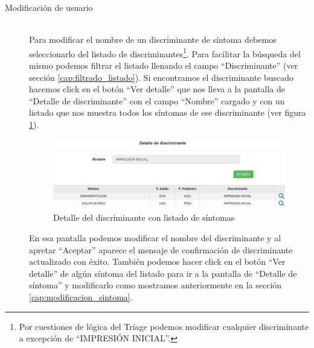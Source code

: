 \begin{description}
\item[Modificación de usuario] \mbox{} \\
Para modificar el nombre de un discriminante de síntoma debemos seleccionarlo del listado de discriminantes\footnote{Por cuestiones de lógica del Triage podemos modificar cualquier discriminante a excepción de ``IMPRESIÓN INICIAL''.}. Para facilitar la búsqueda del mismo podemos filtrar el listado llenando el campo ``Discriminante'' (ver sección \ref{cap:filtrado_listado}). Si encontramos el discriminante buscado hacemos click en el botón ``Ver detalle'' que nos lleva a la pantalla de ``Detalle de discriminante'' con el campo ``Nombre'' cargado y con un listado que nos muestra todos los síntomas de ese discriminante (ver figura \ref{fig:detalle_discriminante}).
\begin{figure}
\centerline{\includegraphics[width=1\textwidth]{listado_sintomas_de_discriminante.png}}
\caption{Detalle del discriminante con listado de síntomas}
\label{fig:detalle_discriminante}
\end{figure}
En esa pantalla podemos modificar el nombre del discriminante y al apretar ``Aceptar'' aparece el mensaje de confirmación de discriminante actualizado con éxito. También podemos hacer click en el botón ``Ver detalle'' de algún síntoma del listado para ir a la pantalla de ``Detalle de síntoma'' y modificarlo como mostramos anteriormente en la sección \ref{cap:modificacion_sintoma}.

\end{description}